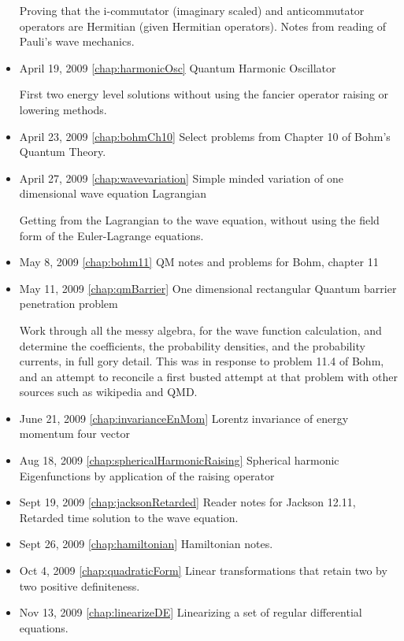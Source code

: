 \begin{itemize}
Proving that the i-commutator (imaginary scaled) and anticommutator operators are Hermitian (given Hermitian operators).  Notes from reading of Pauli's wave mechanics.\item April 19, 2009 \ref{chap:harmonicOsc} Quantum Harmonic Oscillator

First two energy level solutions without using the fancier operator raising or lowering methods. \item April 23, 2009 \ref{chap:bohmCh10} Select problems from Chapter 10 of Bohm's Quantum Theory.

\item April 27, 2009 \ref{chap:wavevariation} Simple minded variation of one dimensional wave equation Lagrangian

Getting from the Lagrangian to the wave equation, without using the field form of the Euler-Lagrange equations. \item May 8, 2009 \ref{chap:bohm11} QM notes and problems for Bohm, chapter 11

\item May 11, 2009 \ref{chap:qmBarrier} One dimensional rectangular Quantum barrier penetration problem

Work through all the messy algebra, for the wave function calculation, and determine the coefficients, the probability densities, and the probability currents, in full gory detail.  This was in response to problem 11.4 of Bohm, and an attempt to reconcile a first busted attempt at that problem with other sources such as wikipedia and QMD. \item June 21, 2009 \ref{chap:invarianceEnMom} Lorentz invariance of energy momentum four vector

\item Aug 18, 2009 \ref{chap:sphericalHarmonicRaising} Spherical harmonic Eigenfunctions by application of the raising operator

\item Sept 19, 2009 \ref{chap:jacksonRetarded} Reader notes for Jackson 12.11, Retarded time solution to the wave equation.

\item Sept 26, 2009 \ref{chap:hamiltonian} Hamiltonian notes.

\item Oct 4, 2009 \ref{chap:quadraticForm} Linear transformations that retain two by two positive definiteness.

\item Nov 13, 2009 \ref{chap:linearizeDE} Linearizing a set of regular differential equations.


\end{itemize}
